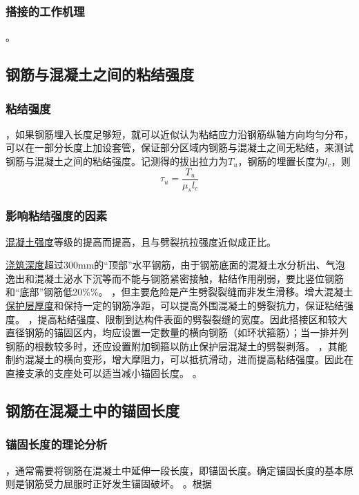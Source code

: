 \documentclass{article}
\begin{document}
\subsubsection{搭接的工作机理}
。
\subsection{钢筋与混凝土之间的粘结强度}
\subsubsection{粘结强度}
，如果钢筋埋入长度足够短，就可以近似认为粘结应力沿钢筋纵轴方向均匀分布，可以在一部分长度上加设套管，保证部分区域内钢筋与混凝土之间无粘结，来测试钢筋与混凝土之间的粘结强度。记测得的拔出拉力为$T_u$，钢筋的埋置长度为$l_c$，则
$$\tau_u=\frac{T_u}{\mu_sl_c}$$
\subsubsection{影响粘结强度的因素}
\underline{混凝土强度}等级的提高而提高，且与劈裂抗拉强度近似成正比。
\par\underline{浇筑深度}超过300mm的“顶部”水平钢筋，由于钢筋底面的混凝土水分析出、气泡逸出和混凝土泌水下沉等而不能与钢筋紧密接触，粘结作用削弱，要比竖位钢筋和“底部”钢筋低20\%\%。
，但主要危险是产生劈裂裂缝而非发生滑移。增大混凝土\underline{保护层厚度}和保持一定的钢筋净距，可以提高外围混凝土的劈裂抗力，保证粘结强度。
，提高粘结强度、限制到达构件表面的劈裂裂缝的宽度。因此搭接区和较大直径钢筋的锚固区内，均应设置一定数量的横向钢筋（如环状箍筋）；当一排并列钢筋的根数较多时，还应设置附加钢箍以防止保护层混凝土的劈裂剥落。
，其能制约混凝土的横向变形，增大摩阻力，可以抵抗滑动，进而提高粘结强度。因此在直接支承的支座处可以适当减小锚固长度。
。
\subsection{钢筋在混凝土中的锚固长度}
\subsubsection{锚固长度的理论分析}
，通常需要将钢筋在混凝土中延伸一段长度，即锚固长度。确定锚固长度的基本原则是钢筋受力屈服时正好发生锚固破坏。
。根据
\end{document}
